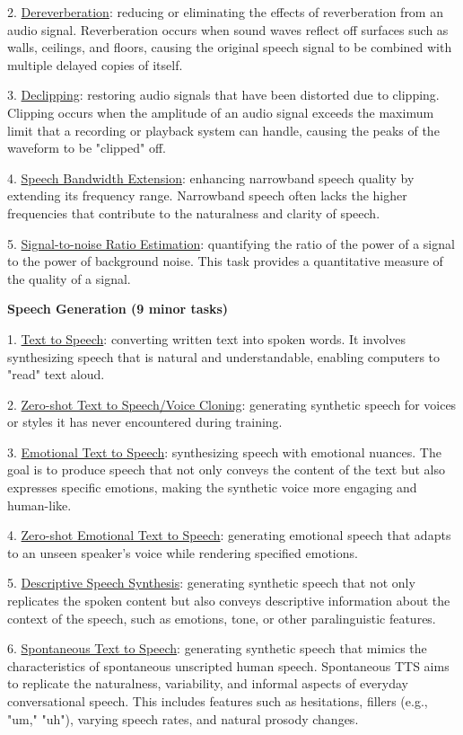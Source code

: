 2. \underline{Dereverberation}: reducing or eliminating the effects of reverberation from an audio signal. Reverberation occurs when sound waves reflect off surfaces such as walls, ceilings, and floors, causing the original speech signal to be combined with multiple delayed copies of itself. 

3. \underline{Declipping}: restoring audio signals that have been distorted due to clipping. Clipping occurs when the amplitude of an audio signal exceeds the maximum limit that a recording or playback system can handle, causing the peaks of the waveform to be "clipped" off.

4. \underline{Speech Bandwidth Extension}: enhancing narrowband speech quality by extending its frequency range. Narrowband speech often lacks the higher frequencies that contribute to the naturalness and clarity of speech.

5. \underline{Signal-to-noise Ratio Estimation}: quantifying the ratio of the power of a signal to the power of background noise. This task provides a quantitative measure of the quality of a signal.


\textbf{Speech Generation (9 minor tasks)}

1. \underline{Text to Speech}: converting written text into spoken words. It involves synthesizing speech that is natural and understandable, enabling computers to "read" text aloud.

2. \underline{Zero-shot Text to Speech/Voice Cloning}: generating synthetic speech for voices or styles it has never encountered during training. 

3. \underline{Emotional Text to Speech}: synthesizing speech with emotional nuances. The goal is to produce speech that not only conveys the content of the text but also expresses specific emotions, making the synthetic voice more engaging and human-like.
		
4. \underline{Zero-shot Emotional Text to Speech}: generating emotional speech that adapts to an unseen speaker’s voice while rendering specified emotions. 

5. \underline{Descriptive Speech Synthesis}: generating synthetic speech that not only replicates the spoken content but also conveys descriptive information about the context of the speech, such as emotions, tone, or other paralinguistic features.

6. \underline{Spontaneous Text to Speech}: generating synthetic speech that mimics the characteristics of spontaneous unscripted human speech. Spontaneous TTS aims to replicate the naturalness, variability, and informal aspects of everyday conversational speech. This includes features such as hesitations, fillers (e.g., "um," "uh"), varying speech rates, and natural prosody changes.

